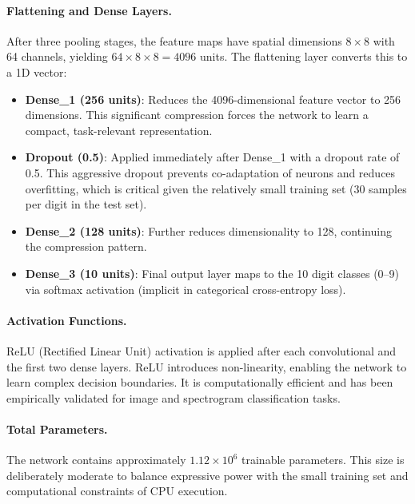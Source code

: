 \paragraph{Flattening and Dense Layers.}
After three pooling stages, the feature maps have spatial dimensions $8\times8$ with 64 channels, yielding $64\times8\times8 = 4096$ units. The flattening layer converts this to a 1D vector:
\begin{itemize}
    \item \textbf{Dense\_1 (256 units)}: Reduces the 4096-dimensional feature vector to 256 dimensions. This significant compression forces the network to learn a compact, task-relevant representation.
    \item \textbf{Dropout (0.5)}: Applied immediately after Dense\_1 with a dropout rate of 0.5. This aggressive dropout prevents co-adaptation of neurons and reduces overfitting, which is critical given the relatively small training set (30 samples per digit in the test set).
    \item \textbf{Dense\_2 (128 units)}: Further reduces dimensionality to 128, continuing the compression pattern.
    \item \textbf{Dense\_3 (10 units)}: Final output layer maps to the 10 digit classes (0–9) via softmax activation (implicit in categorical cross-entropy loss).
\end{itemize}

\paragraph{Activation Functions.}
ReLU (Rectified Linear Unit) activation is applied after each convolutional and the first two dense layers. ReLU introduces non-linearity, enabling the network to learn complex decision boundaries. It is computationally efficient and has been empirically validated for image and spectrogram classification tasks.

\paragraph{Total Parameters.}
The network contains approximately $1.12\times10^6$ trainable parameters. This size is deliberately moderate to balance expressive power with the small training set and computational constraints of CPU execution.

